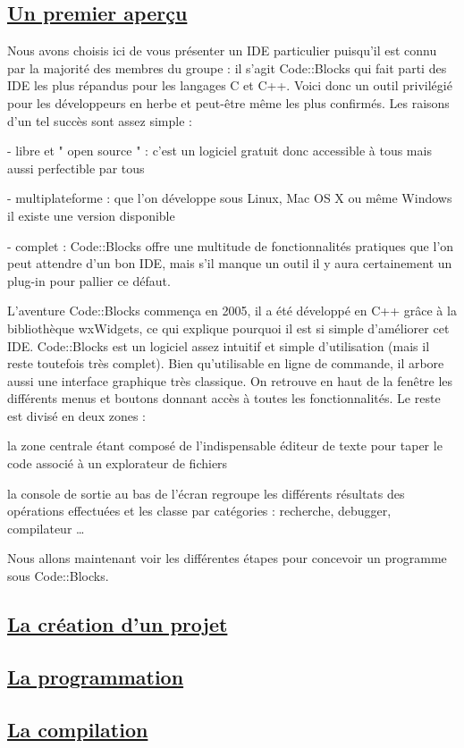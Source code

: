 \documentclass[a4paper, 12pt]{article}
\begin{document}
\begin{doublespace}
\subsection{\underline{Un premier aperçu}} 
	Nous avons choisis ici de vous présenter un IDE particulier puisqu'il est connu par la majorité des membres du groupe : il s'agit Code::Blocks qui fait parti des IDE les plus répandus pour les langages C et C++. Voici donc un outil privilégié pour les développeurs en herbe et peut-être même les plus confirmés. Les raisons d'un tel succès sont assez simple :

- libre et " open source " : c'est un logiciel gratuit donc accessible à tous mais aussi perfectible par tous

- multiplateforme : que l'on développe sous Linux, Mac OS X ou même Windows il existe une version disponible

- complet : Code::Blocks offre une multitude de fonctionnalités pratiques que l'on peut attendre d'un bon IDE, mais s'il manque un outil il y aura certainement un plug-in pour pallier ce défaut.

	L'aventure Code::Blocks commença en 2005, il a été développé en C++ grâce à la bibliothèque wxWidgets, ce qui explique pourquoi il est si simple d'améliorer cet IDE. Code::Blocks est un logiciel assez intuitif et simple d'utilisation (mais il reste toutefois très complet). Bien qu'utilisable en ligne de commande, il arbore aussi une interface graphique très classique. On retrouve en haut de la fenêtre les différents menus et boutons donnant accès à toutes les fonctionnalités.  Le reste est divisé en deux zones : 

la zone centrale étant composé de l'indispensable éditeur de texte pour taper le code associé à un explorateur de fichiers

la console de sortie au bas de l'écran regroupe les différents résultats des opérations effectuées et les classe par catégories : recherche, debugger, compilateur …

Nous allons maintenant voir les différentes étapes pour concevoir un programme sous Code::Blocks.

\subsection{\underline{La création d'un projet}} 

\subsection{\underline{La programmation}} 

\subsection{\underline{La compilation}} 
\end{doublespace}
\end{document}
